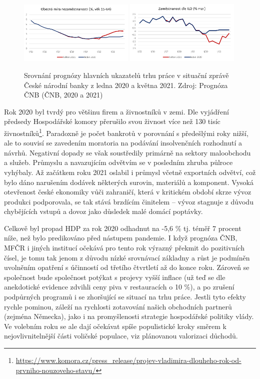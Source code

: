 \begin{figure}[ht]
    \centering
    \includegraphics[width=0.49\textwidth]{./pic/nezamestnanost.png} \includegraphics[width=0.49\textwidth]{./pic/zamestnanost.png}
    \caption{Srovnání prognózy hlavních ukazatelů trhu práce v situační zprávě České národní banky z ledna 2020 a května 2021. Zdroj: Prognóza ČNB (ČNB, 2020 a 2021)}
    \label{fig:110-trhprace}
\end{figure}

Rok 2020 byl tvrdý pro většinu firem a živnostníků v zemi. Dle vyjádření předsedy Hospodářské komory přerušilo svou živnost více než 130 tisíc živnostníků\footnote{\url{https://www.komora.cz/press_release/projev-vladimira-dlouheho-rok-od-prvniho-nouzoveho-stavu/}}. Paradoxně je počet bankrotů v porovnání s předešlými roky nižší, ale to souvisí se zavedením moratoria na podávání insolvenčních rozhodnutí a návrhů. Negativní dopady se však soustředily primárně na sektory maloobchodu a služeb. Průmyslu a navazujícím odvětvím se v posledním zhruba půlroce vyhýbaly. Až začátkem roku 2021 oslabil i průmysl včetně exportních odvětví, což bylo dáno narušením dodávek některých surovin, materiálů a komponent. Vysoká otevřenost české ekonomiky vůči zahraničí, která v kritickém období skrze vývoz produkci podporovala, se tak stává brzdícím činitelem – vývoz stagnuje z důvodu chybějících vstupů a dovoz jako důsledek malé domácí poptávky.

Celkově byl propad HDP za rok 2020 odhadnut na -5,6 \% tj. téměř 7 procent níže, než bylo predikováno před nástupem pandemie. I když prognóza ČNB, MFČR i jiných institucí očekává pro tento rok výrazný překmit do pozitivních čísel, je tomu tak jenom z důvodu nízké srovnávací základny a růst je podmíněn uvolněním opatření s účinností od třetího čtvrtletí až do konce roku. Zároveň se společnost bude společnost potýkat s projevy vyšší inflace (už teď se dle anekdotické evidence zdvihli ceny piva v restauracích o 10 \%), a po zrušení podpůrných programů i se zhoršující se situací na trhu práce. Jestli tyto efekty rychle pominou, záleží na rychlosti zotavování našich obchodních partnerů (zejména Německa), jako i na promyšlenosti strategie hospodářské politiky vlády. Ve volebním roku se ale dají očekávat spíše populistické kroky směrem k nejovlivnitelnější části voličské populace, viz plánovanou valorizaci důchodů.

